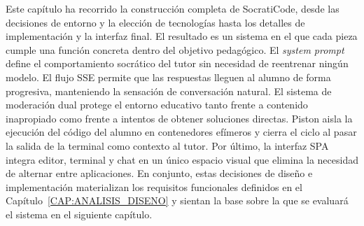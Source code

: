 Este capítulo ha recorrido la construcción completa de SocratiCode, desde las decisiones de entorno y la elección de tecnologías hasta los detalles de implementación y la interfaz final. El resultado es un sistema en el que cada pieza cumple una función concreta dentro del objetivo pedagógico. El \textit{system prompt} define el comportamiento socrático del tutor sin necesidad de reentrenar ningún modelo. El flujo SSE permite que las respuestas lleguen al alumno de forma progresiva, manteniendo la sensación de conversación natural. El sistema de moderación dual protege el entorno educativo tanto frente a contenido inapropiado como frente a intentos de obtener soluciones directas. Piston aisla la ejecución del código del alumno en contenedores efímeros y cierra el ciclo al pasar la salida de la terminal como contexto al tutor. Por último, la interfaz SPA integra editor, terminal y chat en un único espacio visual que elimina la necesidad de alternar entre aplicaciones. En conjunto, estas decisiones de diseño e implementación materializan los requisitos funcionales definidos en el Capítulo~\ref{CAP:ANALISIS_DISENO} y sientan la base sobre la que se evaluará el sistema en el siguiente capítulo.
